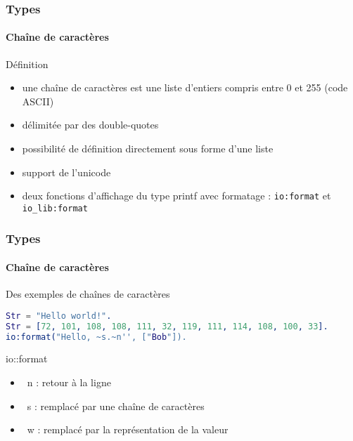 \begin{frame}
  \frametitle{Types}
  \framesubtitle{Chaîne de caractères}

  \begin{block}{Définition}
    \begin{itemize}
      \item une chaîne de caractères est une liste d'entiers compris entre 0
        et 255 (code ASCII)
      \item délimitée par des double-quotes
      \item possibilité de définition directement sous forme d'une liste
      \item support de l'unicode
      \item deux fonctions d'affichage du type printf avec formatage :
        \texttt{io:format} et \texttt{io\_lib:format}
    \end{itemize}
  \end{block}

\end{frame}

\begin{frame}[fragile]
  \frametitle{Types}
  \framesubtitle{Chaîne de caractères}

  \begin{exampleblock}{Des exemples de chaînes de caractères}
    \begin{lstlisting}[language=erlang]
Str = "Hello world!".
Str = [72, 101, 108, 108, 111, 32, 119, 111, 114, 108, 100, 33].
io:format("Hello, ~s.~n'', ["Bob"]).
    \end{lstlisting}
  \end{exampleblock}

  \begin{alertblock}{io::format}
    \begin{itemize}
    \item ~n : retour à la ligne
    \item ~s : remplacé par une chaîne de caractères
    \item ~w : remplacé par la représentation de la valeur
    \end{itemize}
  \end{alertblock}

\end{frame}


